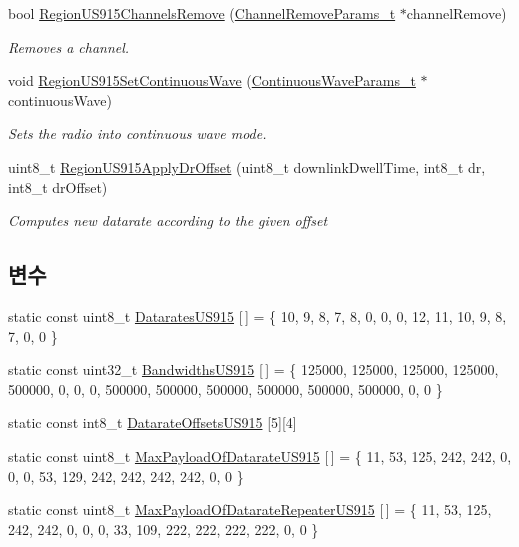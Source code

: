 \begin{DoxyCompactItemize}
bool \mbox{\hyperlink{group___r_e_g_i_o_n_u_s915_gace049f46aefc7abb2152b6013ad5c0a6}{Region\+U\+S915\+Channels\+Remove}} (\mbox{\hyperlink{group___r_e_g_i_o_n_gaa37468560d2fc81a977b57a48e5d72c0}{Channel\+Remove\+Params\+\_\+t}} $\ast$channel\+Remove)
\begin{DoxyCompactList}\small\item\em Removes a channel. \end{DoxyCompactList}\item 
void \mbox{\hyperlink{group___r_e_g_i_o_n_u_s915_gaa87cec170f4c2f1a257f8228b7dd321f}{Region\+U\+S915\+Set\+Continuous\+Wave}} (\mbox{\hyperlink{group___r_e_g_i_o_n_gaf39bb5ba06921139c6d17f88a8d518cd}{Continuous\+Wave\+Params\+\_\+t}} $\ast$continuous\+Wave)
\begin{DoxyCompactList}\small\item\em Sets the radio into continuous wave mode. \end{DoxyCompactList}\item 
uint8\+\_\+t \mbox{\hyperlink{group___r_e_g_i_o_n_u_s915_ga3a13a700c4bbd1a703aaf73740f9f13c}{Region\+U\+S915\+Apply\+Dr\+Offset}} (uint8\+\_\+t downlink\+Dwell\+Time, int8\+\_\+t dr, int8\+\_\+t dr\+Offset)
\begin{DoxyCompactList}\small\item\em Computes new datarate according to the given offset \end{DoxyCompactList}\end{DoxyCompactItemize}
\subsection*{변수}
\begin{DoxyCompactItemize}
\item 
static const uint8\+\_\+t \mbox{\hyperlink{group___r_e_g_i_o_n_u_s915_ga715249ddef431b316389e6ddc55d903b}{Datarates\+U\+S915}} \mbox{[}$\,$\mbox{]} = \{ 10, 9, 8, 7, 8, 0, 0, 0, 12, 11, 10, 9, 8, 7, 0, 0 \}
\item 
static const uint32\+\_\+t \mbox{\hyperlink{group___r_e_g_i_o_n_u_s915_ga43866c304643f3a94e426a1a218ded00}{Bandwidths\+U\+S915}} \mbox{[}$\,$\mbox{]} = \{ 125000, 125000, 125000, 125000, 500000, 0, 0, 0, 500000, 500000, 500000, 500000, 500000, 500000, 0, 0 \}
\item 
static const int8\+\_\+t \mbox{\hyperlink{group___r_e_g_i_o_n_u_s915_ga0eb65060b81a140baf62758bd288d073}{Datarate\+Offsets\+U\+S915}} \mbox{[}5\mbox{]}\mbox{[}4\mbox{]}
\item 
static const uint8\+\_\+t \mbox{\hyperlink{group___r_e_g_i_o_n_u_s915_ga3d3d7c7e8dd5ed69a5305b46e741773c}{Max\+Payload\+Of\+Datarate\+U\+S915}} \mbox{[}$\,$\mbox{]} = \{ 11, 53, 125, 242, 242, 0, 0, 0, 53, 129, 242, 242, 242, 242, 0, 0 \}
\item 
static const uint8\+\_\+t \mbox{\hyperlink{group___r_e_g_i_o_n_u_s915_gac7ace356f70ba085abd9938dbc6f538b}{Max\+Payload\+Of\+Datarate\+Repeater\+U\+S915}} \mbox{[}$\,$\mbox{]} = \{ 11, 53, 125, 242, 242, 0, 0, 0, 33, 109, 222, 222, 222, 222, 0, 0 \}
\end{DoxyCompactItemize}


